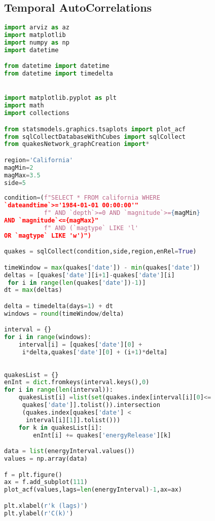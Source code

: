 \documentclass[12pt, twoside]{report}
\begin{document}
\begin{appendices}
\chapter{Temporal AutoCorrelations}

\begin{lstlisting}[language=python, frame=single, tabsize=1] 
import arviz as az
import matplotlib
import numpy as np
import datetime

from datetime import datetime  
from datetime import timedelta 


import matplotlib.pyplot as plt
import math
import collections

from statsmodels.graphics.tsaplots import plot_acf
from sqlCollectDatabaseWithCubes import sqlCollect
from quakesNetwork_graphCreation import*

region='California'
magMin=2
magMax=3.5
side=5
                
condition=(f"SELECT * FROM california WHERE 
`dateandtime`>='1984-01-01 00:00:00'"
           f" AND `depth`>=0 AND `magnitude`>={magMin} 
AND `magnitude`<={magMax}" 
           f" AND (`magtype` LIKE 'l' 
OR `magtype` LIKE 'w')")

quakes = sqlCollect(condition,side,region,enRel=True)

timeWindow = max(quakes['date']) - min(quakes['date'])
deltas = [quakes['date'][i+1]-quakes['date'][i]
 for i in range(len(quakes['date'])-1)]
dt = max(deltas)

delta = timedelta(days=1) + dt
windows = round(timeWindow/delta)

interval = {}
for i in range(windows):
    interval[i] = [quakes['date'][0] +
     i*delta,quakes['date'][0] + (i+1)*delta]
     
     
quakesList = {}
enInt = dict.fromkeys(interval.keys(),0)
for i in range(len(interval)):
    quakesList[i] =list(set(quakes.index[interval[i][0]<=
     quakes['date']].tolist()).intersection
     (quakes.index[quakes['date'] <
      interval[i][1]].tolist()))
    for k in quakesList[i]:
        enInt[i] += quakes['energyRelease'][k]

data = list(energyInterval.values())
values = np.array(data)

f = plt.figure()
ax = f.add_subplot(111)
plot_acf(values,lags=len(energyInterval)-1,ax=ax)

plt.xlabel(r'k (lags)')
plt.ylabel(r'C(k)')

\end{lstlisting}

\end{appendices}



%
\end{document}
